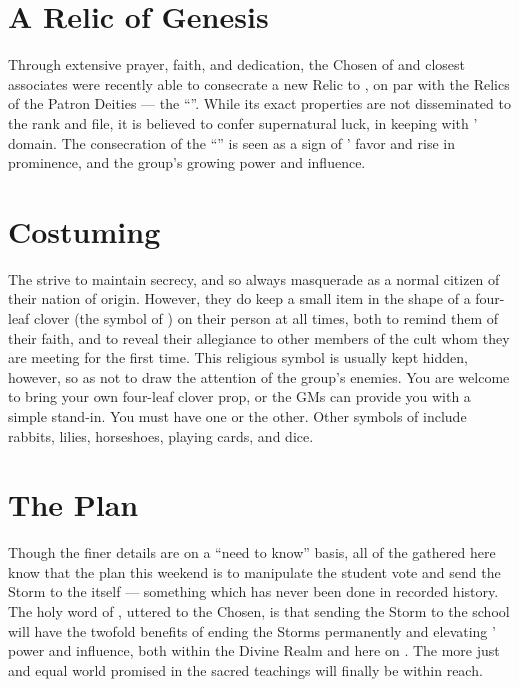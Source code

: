 \documentclass[blue]{GL2020}
\begin{document}
\section*{A Relic of Genesis}
Through extensive prayer, faith, and dedication, the Chosen of \cGenesis{} and \cChupLeader{\their} closest associates were recently able to consecrate a new Relic to \cGenesis{}, on par with the Relics of the Patron Deities — the ``\iHorseshoe{}''. While its exact properties are not disseminated to the rank and file, it is believed to confer supernatural luck, in keeping with \cGenesis{}' domain. The consecration of the ``\iHorseshoe{}'' is seen as a sign of \cGenesis{}' favor and rise in prominence, and the group's growing power and influence.

\section*{Costuming}
The \pGoaties{} strive to maintain secrecy, and so always masquerade as a normal citizen of their nation of origin. However, they do keep a small item in the shape of a four-leaf clover (the symbol of \cGenesis{}) on their person at all times, both to remind them of their faith, and to reveal their allegiance to other members of the cult whom they are meeting for the first time. This religious symbol is usually kept hidden, however, so as not to draw the attention of the group's enemies. You are welcome to bring your own four-leaf clover prop, or the GMs can provide you with a simple stand-in. You must have one or the other. Other symbols of \cGenesis{} include rabbits, lilies, horseshoes, playing cards, and dice.

\section*{The Plan}
Though the finer details are on a “need to know” basis, all of the \pGoaties{} gathered here know that the plan this weekend is to manipulate the student vote and send the Storm to the \pSchool{} itself — something which has never been done in recorded history. The holy word of \cGenesis{}, uttered to the Chosen, is that sending the Storm to the school will have the twofold benefits of ending the Storms permanently and elevating \cGenesis{}’ power and influence, both within the Divine Realm and here on \pEarth{}. The more just and equal world promised in the sacred teachings will finally be within reach. 
\end{document}
